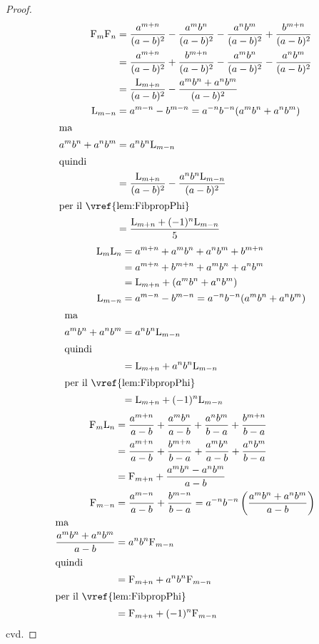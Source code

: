 \begin{proof}
\begin{align*}
	\Fib{m}\Fib{n}={}&\dfrac{a^{m+n}}{(a-b)^2}-\dfrac{a^mb^n}{(a-b)^2}-\dfrac{a^nb^m}{(a-b)^2}+\dfrac{b^{m+n}}{(a-b)^2}\\
	={}&\dfrac{a^{m+n}}{(a-b)^2}+\dfrac{b^{m+n}}{(a-b)^2}-\dfrac{a^mb^n}{(a-b)^2}-\dfrac{a^nb^m}{(a-b)^2}\\
	={}&\dfrac{\Luc{m+n}}{(a-b)^2}-\dfrac{a^mb^n+a^nb^m}{(a-b)^2}\\
	\Luc{m-n}={}&a^{m-n}-b^{m-n}=a^{-n}b^{-n}(a^mb^n+a^nb^m)\\
	\intertext{ma}
	a^mb^n+a^nb^m={}&a^{n}b^{n}\Luc{m-n}\\
	\intertext{quindi}
	={}&\dfrac{\Luc{m+n}}{(a-b)^2}-\dfrac{a^{n}b^{n}\Luc{m-n}}{(a-b)^2}\\
	\intertext{per il~\vref{lem:FibpropPhi}}
	={}&\dfrac{\Luc{m+n}+(-1)^{n}\Luc{m-n}}{5}
\end{align*}
\begin{align*}
	\Luc{m}\Luc{n}={}&a^{m+n}+a^mb^n+a^nb^m+b^{m+n}\\
	={}&a^{m+n}+b^{m+n}+a^mb^n+a^nb^m\\
	={}&\Luc{m+n}+(a^mb^n+a^nb^m)\\
	\Luc{m-n}={}&a^{m-n}-b^{m-n}=a^{-n}b^{-n}(a^mb^n+a^nb^m)\\
	\intertext{ma}
	a^mb^n+a^nb^m={}&a^{n}b^{n}\Luc{m-n}\\
	\intertext{quindi}
	={}&\Luc{m+n}+a^{n}b^{n}\Luc{m-n}\\
	\intertext{per il~\vref{lem:FibpropPhi}}
	={}&\Luc{m+n}+(-1)^{n}\Luc{m-n}
\end{align*}
\begin{align*}
	\Fib{m}\Luc{n}={}&\dfrac{a^{m+n}}{a-b}+\dfrac{a^mb^n}{a-b}+\dfrac{a^nb^m}{b-a}+\dfrac{b^{m+n}}{b-a}\\
	={}&\dfrac{a^{m+n}}{a-b}+\dfrac{b^{m+n}}{b-a}+\dfrac{a^mb^n}{a-b}+\dfrac{a^nb^m}{b-a}\\
	={}&\Fib{m+n}+\dfrac{a^mb^n-a^nb^m}{a-b}\\
	\Fib{m-n}={}&\dfrac{a^{m-n}}{a-b}+\dfrac{b^{m-n}}{b-a}=a^{-n}b^{-n}\left(\dfrac{a^mb^n+a^nb^m}{a-b}\right)\\
	\intertext{ma}
	\dfrac{a^mb^n+a^nb^m}{a-b}={}&a^{n}b^{n}\Fib{m-n}\\
	\intertext{quindi}
	={}&\Fib{m+n}+a^{n}b^{n}\Fib{m-n}\\
	\intertext{per il~\vref{lem:FibpropPhi}}
	={}&\Fib{m+n}+(-1)^{n}\Fib{m-n}
\end{align*}
cvd.
\end{proof}
